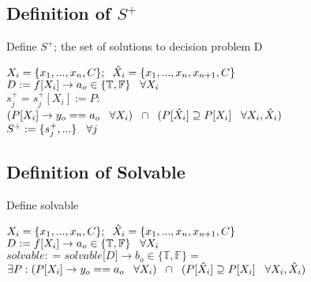 \documentclass[11pt]{article}
\begin{document}
\subsection{Definition of $S^+$}
Define $S^+$; the set of solutions to decision problem D
\begin{center}
$
X_i = \{x_1,...,x_n,C\}; \hspace{2mm} \hat{X}_i = \{x_1,...,x_n,x_{n+1},C\}
$
\\ \vspace{2mm}
$
D := f \lbrack X_i \rbrack \rightarrow a_{o} \in \{\mathbb{T}, \mathbb{F}\} \hspace{3mm} \forall X_i
$
\\ \vspace{2mm}
$
s_j^+ = s_j^+[X_i] := P :
$
\\ \vspace{2mm}
$
(P \lbrack X_i \rbrack \rightarrow y_{o} == a_{o} \hspace{3mm} \forall X_i) \hspace{2mm} \cap \hspace{2mm} (P[\hat{X}_i] \supseteq P[X_i] \hspace{3mm} \forall X_i,\hat{X}_i)
$
\\ \vspace{2mm}
$
S^+ := \{s^+_j,...\} \hspace{3mm} \forall j
$
\end{center}





\subsection{Definition of Solvable}
Define solvable
\begin{center}
$
X_i = \{x_1,...,x_n,C\}; \hspace{2mm} \hat{X}_i = \{x_1,...,x_n,x_{n+1},C\}
$
\\ \vspace{2mm}
$
D := f \lbrack X_i \rbrack \rightarrow a_{o} \in \{\mathbb{T}, \mathbb{F}\} \hspace{3mm} \forall X_i
$
\\ \vspace{2mm}
$solvable : = solvable \lbrack D \rbrack \rightarrow b_o \in \{ \mathbb{T}, \mathbb{F} \} =$
\\ \vspace{2mm}
$\exists P : (P \lbrack X_i \rbrack \rightarrow y_{o} == a_{o} \hspace{3mm} \forall X_i) \hspace{2mm} \cap \hspace{2mm} (P[\hat{X}_i] \supseteq P[X_i] \hspace{3mm} \forall X_i,\hat{X}_i)
$
\end{center}
\end{document}

